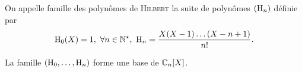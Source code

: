 \begin{defi}
    On appelle famille des polynômes de \textsc{Hilbert} la suite de polynômes $(\mathrm{H}_n)$ définie par
    $$\mathrm{H}_0(X) = 1,\ \forall n \in \mathbb{N}^\star,\ \mathrm{H}_n = \frac{X(X-1)\dots(X-n+1)}{n!}.$$
\end{defi}

\begin{prop}
    La famille $(\mathrm{H}_0, \dots, \mathrm{H}_n)$ forme une base de $\mathbb{C}_n[X]$.
\end{prop}

\begin{preuve}
\end{preuve}